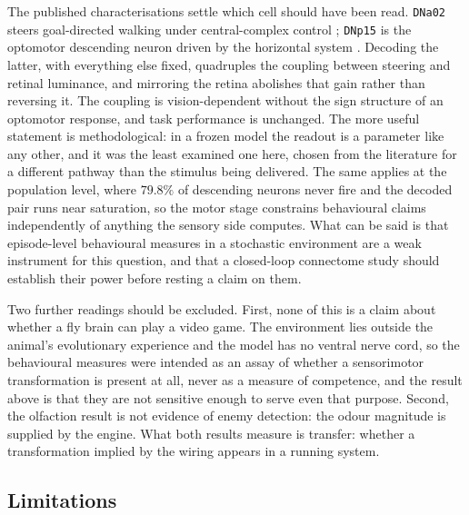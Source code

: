 \documentclass[10pt,twoside]{article}
\newcommand{\cell}[1]{\texttt{#1}}
\begin{document}
The published characterisations settle which cell should have been read.
\cell{DNa02} steers goal-directed walking under central-complex control
\citep{rayshubskiy2025}; \cell{DNp15} is the optomotor descending neuron
driven by the horizontal system \citep{suver2016,namiki2018}. Decoding the
latter, with everything else fixed, quadruples the coupling between steering
and retinal luminance, and mirroring the retina abolishes that gain rather
than reversing it. The coupling is vision-dependent without the sign structure
of an optomotor response, and task performance is unchanged. The more useful
statement is methodological: in a frozen model the readout is a parameter like
any other, and it was the least examined one here, chosen from the literature
for a different pathway than the stimulus being delivered. The same applies at the population
level, where $79.8\%$ of descending neurons never fire and the decoded pair
runs near saturation, so the motor stage constrains behavioural claims
independently of anything the sensory side computes. What can be said is
that episode-level behavioural measures in a stochastic environment are a weak
instrument for this question, and that a closed-loop connectome study should
establish their power before resting a claim on them.

Two further readings should be excluded. First, none of this is a claim about
whether a fly brain can play a video game. The environment lies outside the
animal's evolutionary experience and the model has no ventral nerve cord, so
the behavioural measures were intended as an assay of whether a sensorimotor
transformation is present at all, never as a measure of competence, and the
result above is that they are not sensitive enough to serve even that purpose.
Second, the olfaction result
is not evidence of enemy detection: the odour magnitude is supplied by the
engine. What both results measure is transfer: whether a transformation
implied by the wiring appears in a running system.

\subsection{Limitations}
\end{document}
